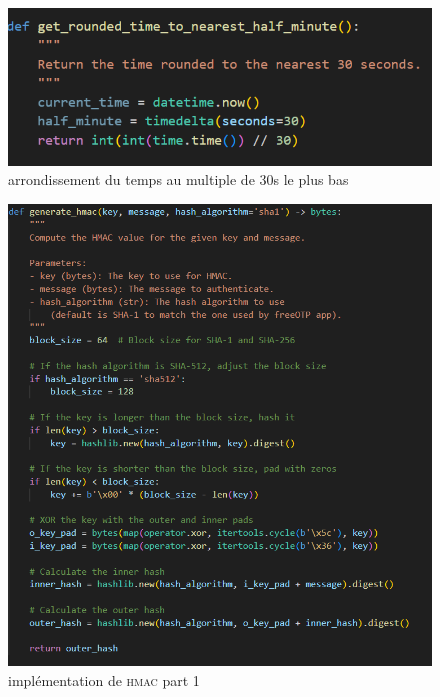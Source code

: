 \documentclass[a4paper, 10pt]{article}
\newcommand{\hmac}{\textsc{hmac} }
\begin{document}
\begin{figure}[H]
        \centering
        \includegraphics[scale=0.8]{img/C_proto/code/code_round_time.png}
        \caption{arrondissement du temps au multiple de 30s le plus bas\\}
        \label{fig:code-round-time}
\end{figure}

\begin{figure}[H]
        \centering
        \includegraphics[scale=1]{img/C_proto/code/code_hmac.png}
        \caption{implémentation de \hmac part 1\\}
        \label{fig:code-hmac}
\end{figure}
\end{document}
